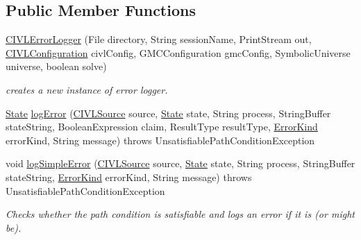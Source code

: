\subsection*{Public Member Functions}
\begin{DoxyCompactItemize}
\item 
\hyperlink{classedu_1_1udel_1_1cis_1_1vsl_1_1civl_1_1log_1_1IF_1_1CIVLErrorLogger_a5ae3f46feb78d37487a50b2f89f2cf0d}{C\+I\+V\+L\+Error\+Logger} (File directory, String session\+Name, Print\+Stream out, \hyperlink{classedu_1_1udel_1_1cis_1_1vsl_1_1civl_1_1config_1_1IF_1_1CIVLConfiguration}{C\+I\+V\+L\+Configuration} civl\+Config, G\+M\+C\+Configuration gmc\+Config, Symbolic\+Universe universe, boolean solve)
\begin{DoxyCompactList}\small\item\em creates a new instance of error logger. \end{DoxyCompactList}\item 
\hyperlink{interfaceedu_1_1udel_1_1cis_1_1vsl_1_1civl_1_1state_1_1IF_1_1State}{State} \hyperlink{classedu_1_1udel_1_1cis_1_1vsl_1_1civl_1_1log_1_1IF_1_1CIVLErrorLogger_aa473ed1e1d4106f585a9699d2d3d7139}{log\+Error} (\hyperlink{interfaceedu_1_1udel_1_1cis_1_1vsl_1_1civl_1_1model_1_1IF_1_1CIVLSource}{C\+I\+V\+L\+Source} source, \hyperlink{interfaceedu_1_1udel_1_1cis_1_1vsl_1_1civl_1_1state_1_1IF_1_1State}{State} state, String process, String\+Buffer state\+String, Boolean\+Expression claim, Result\+Type result\+Type, \hyperlink{enumedu_1_1udel_1_1cis_1_1vsl_1_1civl_1_1model_1_1IF_1_1CIVLException_1_1ErrorKind}{Error\+Kind} error\+Kind, String message)  throws Unsatisfiable\+Path\+Condition\+Exception 
\item 
void \hyperlink{classedu_1_1udel_1_1cis_1_1vsl_1_1civl_1_1log_1_1IF_1_1CIVLErrorLogger_af952f1931adda68299fcf692d5fb9288}{log\+Simple\+Error} (\hyperlink{interfaceedu_1_1udel_1_1cis_1_1vsl_1_1civl_1_1model_1_1IF_1_1CIVLSource}{C\+I\+V\+L\+Source} source, \hyperlink{interfaceedu_1_1udel_1_1cis_1_1vsl_1_1civl_1_1state_1_1IF_1_1State}{State} state, String process, String\+Buffer state\+String, \hyperlink{enumedu_1_1udel_1_1cis_1_1vsl_1_1civl_1_1model_1_1IF_1_1CIVLException_1_1ErrorKind}{Error\+Kind} error\+Kind, String message)  throws Unsatisfiable\+Path\+Condition\+Exception 
\begin{DoxyCompactList}\small\item\em Checks whether the path condition is satisfiable and logs an error if it is (or might be). \end{DoxyCompactList}\end{DoxyCompactItemize}


